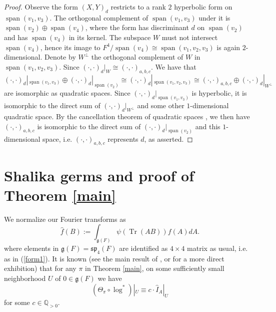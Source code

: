 \documentclass[11pt]{amsart}
\theoremstyle{remark}
\newcommand{\Q}{\mathbb{Q}}
\newcommand{\Tr}{\operatorname{Tr}}
\newcommand{\fg}{\mathfrak{g}}
\renewcommand{\span}{\operatorname{span}}
\begin{document}
\begin{proof}
Observe the form $(X,Y)_d$ restricts to a rank $2$ hyperbolic form on $\span(v_1,v_3)$. The orthogonal complement of $\span(v_1,v_3)$ under it is $\span(v_2)\oplus\span(v_4)$, where the form has discriminant $d$ on $\span(v_2)$ and has $\span(v_4)$ in its kernel. The subspace $W$ must not intersect $\span(v_4)$, hence its image to $F^4/\span(v_4)\cong\span(v_1,v_2,v_3)$ is again $2$-dimensional. Denote by $W^{\perp}$ the orthogonal complement of $W$ in $\span(v_1,v_2,v_3)$. Since $(\cdot,\cdot)_d|_W\cong (\cdot,\cdot)_{a,b,c}$. We have that
\[ (\cdot,\cdot)_d|_{\span(v_1,v_3)}\oplus(\cdot,\cdot)_d|_{\span(v_2)}\cong(\cdot,\cdot)_d|_{\span(v_1,v_2,v_3)}\cong(\cdot,\cdot)_{a,b,c}\oplus(\cdot,\cdot)_{d}|_{W^{\perp}}\]
are isomorphic as quadratic spaces. Since $(\cdot,\cdot)_d|_{\span(v_1,v_3)}$ is hyperbolic, it is isomorphic to the direct sum of $(\cdot,\cdot)_{d}|_{W^{\perp}}$ and some other $1$-dimensional quadratic space. By the cancellation theorem of quadratic spaces \cite[pp. 34, Thm. 4]{Ser73}, we then have $(\cdot,\cdot)_{a,b,c}$ is isomorphic to the direct sum of $(\cdot,\cdot)_d|_{\span(v_2)}$ and this $1$-dimensional space, i.e. $(\cdot,\cdot)_{a,b,c}$ represents $d$, as asserted.
\end{proof}

\section{Shalika germs and proof of Theorem \ref{main}}

We normalize our Fourier transforms as
\[
\hat{f}(B):=\int_{\fg(F)}\psi(\Tr(AB))f(A)dA.
\]
where elements in $\fg(F)=\mathfrak{sp}_4(F)$ are identified as $4\times 4$ matrix as usual, i.e. as in (\ref{form1}). It is known (see the main result of \cite{KM03}, or \cite[(6.1)]{Ka15} for a more direct exhibition) that for any $\pi$ in Theorem \ref{main}, on some sufficiently small neighborhood $U$ of $0\in\fg(F)$ we have
\begin{equation}\label{Murnaghan}
(\Theta_{\pi}\circ\log^*)|_U\equiv c\cdot\hat{I}_A|_{U}
\end{equation}
for some $c\in\Q_{>0}$. 
\end{document}
